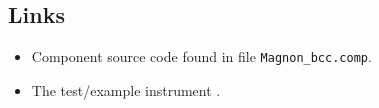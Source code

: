 \subsection*{Links}
\begin{itemize}
  \item Component source code found in file \texttt{Magnon\_bcc.comp}.
  \item The test/example instrument .
\end{itemize}
